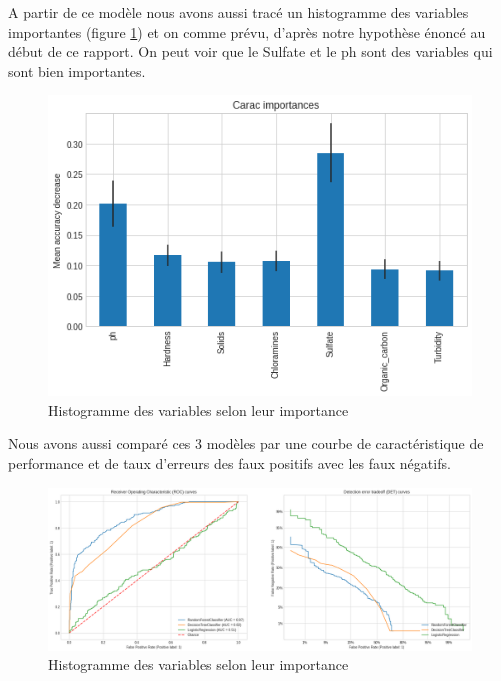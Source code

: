\documentclass[12pt, a4paper]{article}
\begin{document}
    A partir de ce modèle nous avons aussi tracé un histogramme des variables importantes (figure \ref{fig:imp_car}) et on comme prévu, d'après notre hypothèse énoncé au début de ce rapport. On peut voir que le Sulfate et le ph sont des variables qui sont bien importantes.
    
    \begin{figure}[H]
           \centering
           \includegraphics[width=13cm]{images/output_83_0.png}
           \caption{Histogramme des variables selon leur importance}
            \label{fig:imp_car}
    \end{figure}

    Nous avons aussi comparé ces 3 modèles par une courbe de caractéristique de performance et de taux d'erreurs des faux positifs avec les faux négatifs. 
    
    \begin{figure}[H]
           \centering
           \includegraphics[width=\textwidth]{images/output_86_0.png}
           \caption{Histogramme des variables selon leur importance}
            \label{fig:ROC_DET}
    \end{figure}
    
\end{document}
